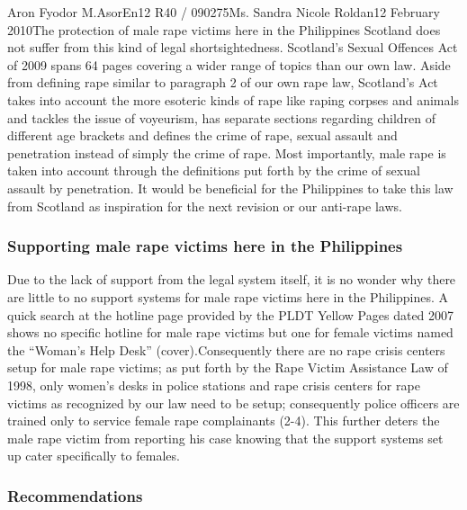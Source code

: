 \documentclass[12pt,letterpaper]{article}
\begin{document}
\begin{mla}{Aron Fyodor M.}{Asor}{En12 R40 / 090275}{Ms. Sandra Nicole Roldan}{12 February 2010}{The protection of male rape victims here in the Philippines}
%
%
Scotland does not suffer from this kind of legal shortsightedness. Scotland's Sexual Offences Act of 2009 spans 64 pages covering a wider range of topics than our own law. Aside from defining rape similar to paragraph 2 of our own rape law, Scotland's Act takes into account the more esoteric kinds of rape like raping corpses and animals and tackles the issue of voyeurism, has separate sections regarding children of different age brackets and defines the crime of rape, sexual assault and penetration instead of simply the crime of rape. Most importantly, male rape is taken into account through the definitions put forth by the crime of sexual assault by penetration. It would be beneficial for the Philippines to take this law from Scotland as inspiration for the next revision or our anti-rape laws.

%
%
\subsubsection{Supporting male rape victims here in the Philippines}
Due to the lack of support from the legal system itself, it is no wonder why there are little to no support systems for male rape victims here in the Philippines. A quick search at the hotline page provided by the PLDT Yellow Pages dated 2007 shows no specific hotline for male rape victims but one for female victims named the ``Woman's Help Desk'' (cover).Consequently there are no rape crisis centers setup for male rape victims; as put forth by the Rape Victim Assistance Law of 1998, only women's desks in police stations and rape crisis centers for rape victims as recognized by our law need to be setup; consequently police officers are trained only to service female rape complainants (2-4). This further deters the male rape victim from reporting his case knowing that the support systems set up cater specifically to females.

%
%
\subsubsection{Recommendations}


\end{mla}
\end{document}
